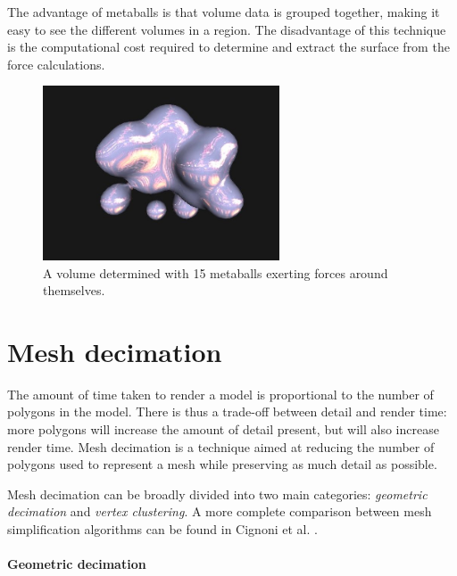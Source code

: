 The advantage of metaballs is that volume data is grouped together, making it
easy to see the different volumes in a region. The disadvantage of this
technique is the computational cost required to determine and extract the
surface from the force calculations.

\begin{figure}
  \begin{center}
    \includegraphics[width=70mm]{metaballs}
  \end{center}

  \caption{A volume determined with 15 metaballs exerting forces around
  themselves.}

  \label{fig:background_metaballs}
\end{figure}



\section{Mesh decimation}
\label{sec:background_decimation}

The amount of time taken to render a model is proportional to the number of
polygons in the model. There is thus a trade-off between detail and render
time: more polygons will increase the amount of detail present, but will also
increase render time. Mesh decimation is a technique aimed at reducing the
number of polygons used to represent a mesh while preserving as much detail as
possible.

Mesh decimation can be broadly divided into two main categories:
\emph{geometric decimation} and \emph{vertex clustering}. A more complete
comparison between mesh simplification algorithms can be found in Cignoni et
al. \citep{cignoni98}.

\paragraph{Geometric decimation}

